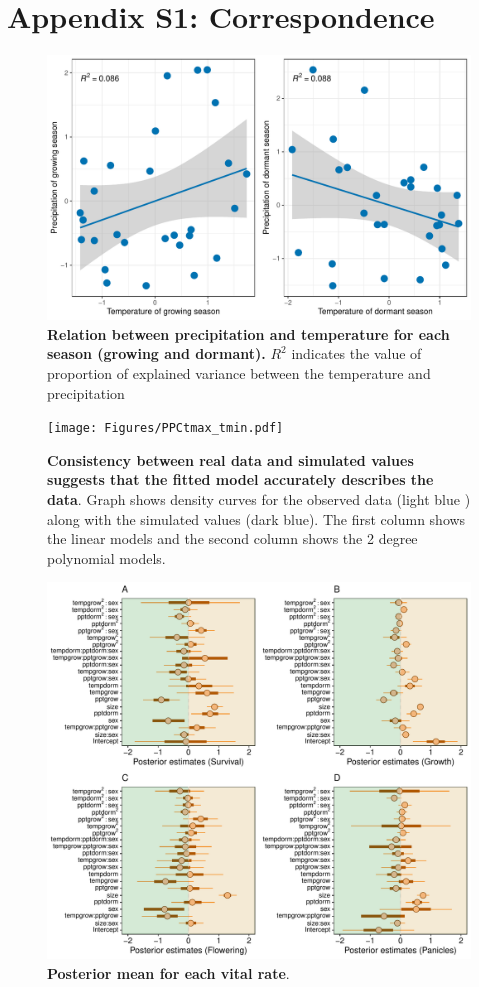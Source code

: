 \documentclass[11pt]{article}
\begin{document}
\section*{Appendix S1: Correspondence }
\renewcommand{\thefigure}{A\arabic{figure}}\setcounter{figure}{0}
\renewcommand{\thetable}{A\arabic{table}}\setcounter{table}{0}
\renewcommand{\theequation}{A\arabic{equation}}\setcounter{equation}{0}
	\begin{figure}[H]
		\centering
		\includegraphics[width = \linewidth]{Figures/Varianceexplained.pdf}
		\caption{\textbf{Relation between precipitation and temperature for each season (growing and dormant).} $R^2$ indicates the value of proportion of explained variance between the temperature and precipitation}
	\end{figure}
	
  \begin{figure}[H]
		\centering
		\texttt{[image: Figures/PPCtmax\_tmin.pdf]}
		\caption{\textbf{Consistency between real data and simulated values suggests that the fitted model accurately describes the data}. Graph shows density curves for the observed data (light blue ) along with the simulated values (dark blue). The first column shows the linear models and the second column shows the 2 degree polynomial models.}
	\end{figure}
	
	
	 \begin{figure}%
		\centering
		\includegraphics[scale = 4.5]{Figures/Posterior_mean.pdf}
		\caption{\textbf{Posterior mean for each vital rate}. }
	\end{figure}
	



\end{document}
